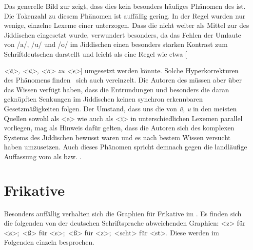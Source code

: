  
Das generelle Bild zur  zeigt, dass dies kein besonders häufiges Phänomen des \hai{{\LiJi}} ist. Die Tokenzahl zu diesem Phänomen ist auffällig gering. In der Regel wurden nur wenige, einzelne Lexeme einer  unterzogen. Dass die  nicht weiter als Mittel zur  des Jiddischen eingesetzt wurde, verwundert besonders, da das Fehlen der Umlaute von /a/, /u/ und /o/ im Jiddischen einen besonders starken Kontrast zum Schriftdeutschen darstellt und leicht als eine Regel wie etwa [{\textit{<ä>, <ü>, <ö> zu <e>}] umgesetzt werden könnte. Solche Hyperkorrekturen des Phänomens finden \,%
sich auch vereinzelt.
Die Autoren des \hai{{\LiJi}} müssen aber über das Wissen verfügt haben, dass die Entrundungen und besonders die daran geknüpften Senkungen im Jiddischen keinen synchron erkennbaren Gesetzmäßigkeiten folgen. Der Umstand, dass uns die  von {\mhd} \textit{ü}, \textit{u} in den meisten Quellen sowohl als <e> wie auch als <i> in unterschiedlichen Lexemen parallel vorliegen, mag als Hinweis dafür gelten, dass die Autoren sich des komplexen Systems des Jiddischen bewusst waren und es nach bestem Wissen versucht haben umzusetzen. Auch dieses Phänomen spricht demnach gegen die landläufige Auffassung vom  als  bzw. .

\newpage 
  \section{Frikative}\label{frikative}
Besonders auffällig verhalten sich die Graphien für Frikative im . Es finden sich die folgenden von der deutschen Schriftsprache abweichenden Graphien: <z> für <s>;\, <ß> für <s>;\, <ß> für <z>;\, <scht> für <st>. Diese werden im Folgenden einzeln besprochen. 

}
